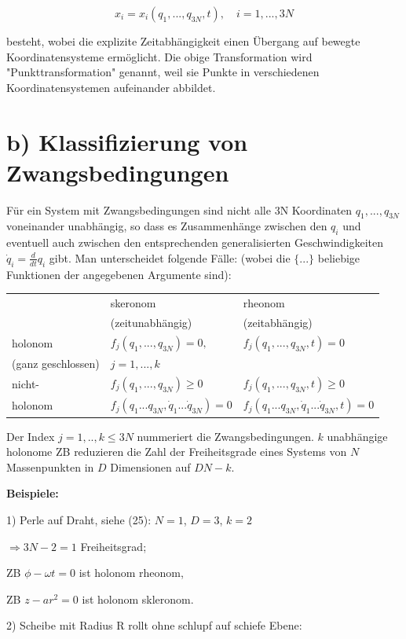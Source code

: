 \documentclass[10pt, letterpaper]{article}
\begin{document}
\[
x_i = x_i(q_1,...,q_{3N},t), \quad i=1,...,3N
\]

besteht, wobei die explizite Zeitabhängigkeit einen Übergang auf bewegte Koordinatensysteme ermöglicht. Die obige Transformation wird "Punkttransformation" genannt, weil sie Punkte in verschiedenen Koordinatensystemen aufeinander abbildet.

\section*{b) Klassifizierung von Zwangsbedingungen}

Für ein System mit Zwangsbedingungen sind nicht alle 3N Koordinaten $q_1,...,q_{3N}$ voneinander unabhängig, so dass es Zusammenhänge zwischen den $q_i$ und eventuell auch zwischen den entsprechenden generalisierten Geschwindigkeiten $\dot{q}_i = \frac{d}{dt}q_i$ gibt. Man unterscheidet folgende Fälle: (wobei die $\{...\}$ beliebige Funktionen der angegebenen Argumente sind):
\begin{tabular}{|l|l|l|}
\hline
 & skeronom & rheonom \\
 & (zeitunabhängig) & (zeitabhängig) \\
\hline
holonom & $f_j(q_1,...,q_{3N}) = 0,$ & $f_j(q_1,...,q_{3N},t) = 0$ \\
(ganz geschlossen) & $j = 1,...,k$ & \\
\hline
nicht- & $f_j(q_1,...,q_{3N}) \geq 0$ & $f_j(q_1,...,q_{3N},t) \geq 0$ \\
holonom & $f_j(q_1...q_{3N},\dot{q}_1...\dot{q}_{3N}) = 0$ & $f_j(q_1...q_{3N},\dot{q}_1...\dot{q}_{3N},t) = 0$ \\
\hline
\end{tabular}

Der Index $j = 1,..,k \leq 3N$ nummeriert die Zwangsbedingungen. $k$ unabhängige holonome ZB reduzieren die Zahl der Freiheitsgrade eines Systems von $N$ Massenpunkten in $D$ Dimensionen auf $DN-k$.

\textbf{Beispiele:}

1) Perle auf Draht, siehe (25): $N=1$, $D=3$, $k=2$
   
   $\Rightarrow 3N-2 = 1$ Freiheitsgrad;
   
   ZB $\phi - \omega t = 0$ ist holonom rheonom,
   
   ZB $z-ar^2 = 0$ ist holonom skleronom.

2) Scheibe mit Radius R rollt ohne schlupf auf schiefe Ebene:

\end{document}
